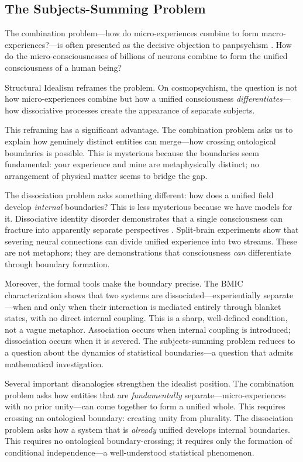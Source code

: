 \documentclass[11pt,a4paper]{article}
\theoremstyle{definition}
\theoremstyle{plain}
\theoremstyle{remark}
\begin{document}
\subsection{The Subjects-Summing Problem}\label{sec:subjects}

The combination problem---how do micro-experiences combine to form macro-experiences?---is often presented as the decisive objection to panpsychism \citep{Chalmers2015}. How do the micro-consciousnesses of billions of neurons combine to form the unified consciousness of a human being?

Structural Idealism reframes the problem. On cosmopsychism, the question is not how micro-experiences combine but how a unified consciousness \textit{differentiates}---how dissociative processes create the appearance of separate subjects.

This reframing has a significant advantage. The combination problem asks us to explain how genuinely distinct entities can merge---how crossing ontological boundaries is possible. This is mysterious because the boundaries seem fundamental: your experience and mine are metaphysically distinct; no arrangement of physical matter seems to bridge the gap.

The dissociation problem asks something different: how does a unified field develop \textit{internal} boundaries? This is less mysterious because we have models for it. Dissociative identity disorder demonstrates that a single consciousness can fracture into apparently separate perspectives \citep{Kastrup2019}. Split-brain experiments show that severing neural connections can divide unified experience into two streams. These are not metaphors; they are demonstrations that consciousness \textit{can} differentiate through boundary formation.

Moreover, the formal tools make the boundary precise. The BMIC characterization shows that two systems are dissociated---experientially separate---when and only when their interaction is mediated entirely through blanket states, with no direct internal coupling. This is a sharp, well-defined condition, not a vague metaphor. Association occurs when internal coupling is introduced; dissociation occurs when it is severed. The subjects-summing problem reduces to a question about the dynamics of statistical boundaries---a question that admits mathematical investigation.

Several important disanalogies strengthen the idealist position. The combination problem asks how entities that are \textit{fundamentally} separate---micro-experiences with no prior unity---can come together to form a unified whole. This requires crossing an ontological boundary: creating unity from plurality. The dissociation problem asks how a system that is \textit{already} unified develops internal boundaries. This requires no ontological boundary-crossing; it requires only the formation of conditional independence---a well-understood statistical phenomenon.
\end{document}
